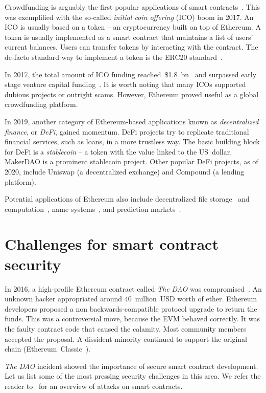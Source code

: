 Crowdfunding is arguably the first popular applications of smart contracts~\cite{McAdams2017}.
This was exemplified with the so-called \textit{initial coin offering} (ICO) boom in 2017.
An ICO is usually based on a token -- an cryptocurrency built on top of Ethereum.
A token is usually implemented as a smart contract that maintains a list of users' current balances.
Users can transfer tokens by interacting with the contract.
The de-facto standard way to implement a token is the ERC20 standard~\cite{Victor2019}.

In 2017, the total amount of ICO funding reached~\$1.8~bn~\cite{CoindeakICOTracker} and surpassed early stage venture capital funding~\cite{Sunnarborg2017}.
It is worth noting that many ICOs supported dubious projects or outright scams.
However, Ethereum proved useful as a global crowdfunding platform.

In 2019, another category of Ethereum-based applications known as \textit{decentralized finance}, or \textit{DeFi}, gained momentum.
DeFi projects try to replicate traditional financial services, such as loans, in a more trustless way.
The basic building block for DeFi is a \textit{stablecoin} -- a token with the value linked to the US~dollar.
MakerDAO is a prominent stablecoin project.
Other popular DeFi projects, as of 2020, include Uniswap (a decentralized exchange) and Compound (a lending platform).

Potential applications of Ethereum also include decentralized file storage~\cite{Storj} and computation~\cite{Golem}, name systems~\cite{ENS}, and prediction markets~\cite{Augur, Gnosis}.


\section{Challenges for smart contract security}

In 2016, a high-profile Ethereum contract called \textit{The DAO} was compromised~\cite{Sirer2016}.
An unknown hacker appropriated around $40$~million~USD worth of ether.
Ethereum developers proposed a non backwards-compatible protocol upgrade to return the funds.
This was a controversial move, because the EVM behaved correctly.
It was the faulty contract code that caused the calamity.
Most community members accepted the proposal.
A dissident minority continued to support the original chain (Ethereum~Classic~\cite{EthereumClassic}).

\textit{The DAO} incident showed the importance of secure smart contract development.
Let us list some of the most pressing security challenges in this area.
We refer the reader to~\cite{Delmolino2016, Atzei2017} for an overview of attacks on smart contracts.

